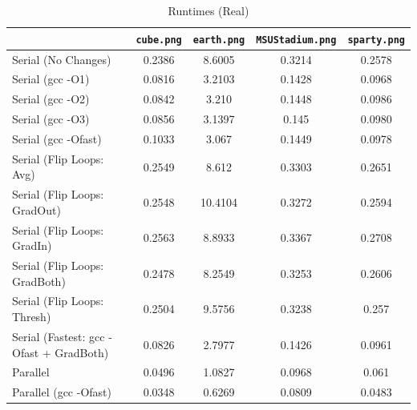 \documentclass[9pt, technote, onecolumn]{IEEEtran}
\begin{document}
\begin{table}
    \renewcommand{\arraystretch}{1.3}
    \caption{Runtimes (Real)}
    \centering

    \begin{tabular}{|l||c|c|c|c|}
    \hline
    & \texttt{cube.png} & \texttt{earth.png} & \texttt{MSUStadium.png} & \texttt{sparty.png} \\ \hline
    \hline
	Serial (No Changes) &  0.2386 & 8.6005 & 0.3214 & 0.2578 \\ \hline \hline
	\hline
	Serial (gcc -O1) & 0.0816 & 3.2103 & 0.1428 & 0.0968 \\ \hline 
	Serial (gcc -O2) & 0.0842 & 3.210 & 0.1448 & 0.0986 \\ \hline 
	Serial (gcc -O3) & 0.0856 & 3.1397 & 0.145 & 0.0980 \\ \hline 
	Serial (gcc -Ofast) & 0.1033 & 3.067 & 0.1449 & 0.0978 \\ \hline 
	\hline
	Serial (Flip Loops: Avg) & 0.2549 & 8.612 & 0.3303 & 0.2651 \\ \hline 
	Serial (Flip Loops: GradOut) & 0.2548 & 10.4104 & 0.3272 & 0.2594 \\ \hline 
	Serial (Flip Loops: GradIn) & 0.2563 & 8.8933 & 0.3367 & 0.2708 \\ \hline 
	Serial (Flip Loops: GradBoth) & 0.2478 & 8.2549 & 0.3253 & 0.2606 \\ \hline 
	Serial (Flip Loops: Thresh) & 0.2504 & 9.5756 & 0.3238 & 0.257 \\ \hline 
	\hline
	Serial (Fastest: gcc -Ofast + GradBoth) & 0.0826 & 2.7977 & 0.1426 & 0.0961 \\ \hline 
	\hline
	Parallel & 0.0496 & 1.0827 & 0.0968 & 0.061 \\ \hline 
	Parallel (gcc -Ofast) & 0.0348 & 0.6269 & 0.0809 & 0.0483 \\ \hline 
    \end{tabular}

\end{table}
\end{document}
